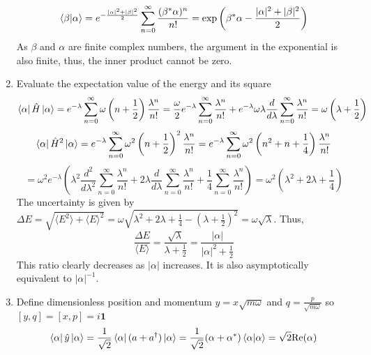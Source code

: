 \begin{sol}
\begin{enumerate}[label=\textbf{(\alph*)}]
\begin{equation}
	\braket{\beta}{\alpha}=e^{-\frac{|\alpha|^2+|\beta|^2}{2}}\sum_{n=0}^\infty\frac{(\beta^*\alpha)^n}{n!}=\exp\left(\beta^*\alpha-\frac{|\alpha|^2+|\beta|^2}{2}\right)
\end{equation} As $\beta$ and $\alpha$ are finite complex numbers, the argument in the exponential is also finite, thus, the inner product cannot be zero.
\item
Evaluate the expectation value of the energy and its square
\begin{equation}
	\bra\alpha\hat H\ket\alpha=e^{-\lambda}\sum_{n=0}^\infty\omega\left(n+\frac{1}{2}\right)\frac{\lambda^n}{n!}=\frac{\omega}{2}e^{-\lambda}\sum_{n=0}^\infty\frac{\lambda^n}{n!}+e^{-\lambda}\omega\lambda\frac{d}{d\lambda}\sum_{n=0}^\infty\frac{\lambda^n}{n!}=\omega\left(\lambda+\frac{1}{2}\right)
\end{equation}
\begin{equation}
	\bra\alpha\hat H^2\ket\alpha=e^{-\lambda}\sum_{n=0}^\infty\omega^2\left(n+\frac{1}{2}\right)^2\frac{\lambda^n}{n!}=e^{-\lambda}\sum_{n=0}^\infty\omega^2\left(n^2+n+\frac{1}{4}\right)\frac{\lambda^n}{n!}
\end{equation} 
\begin{equation}
	=\omega^2e^{-\lambda}\left(\lambda^2\frac{d^2}{d\lambda^2}\sum_{n=0}^\infty\frac{\lambda^n}{n!}+2\lambda\frac{d}{d\lambda}\sum_{n=0}^\infty\frac{\lambda^n}{n!}+\frac{1}{4}\sum_{n=0}^\infty\frac{\lambda^n}{n!}\right)=\omega^2\left(\lambda^2+2\lambda+\frac{1}{4}\right)
\end{equation}
The uncertainty is given by $\Delta E = \sqrt{\langle E^2\rangle+\langle E\rangle^2}=\omega\sqrt{\lambda^2+2\lambda+\frac{1}{4}-\left(\lambda+\frac{1}{2}\right)^2}=\omega\sqrt\lambda$. Thus,
\begin{equation}
	\frac{\Delta E}{\langle E\rangle}=\frac{\sqrt{\lambda}}{\lambda+\frac{1}{2}}=\frac{|\alpha|}{|\alpha|^2+\frac{1}{2}}
\end{equation} 
This ratio clearly decreases as $|\alpha|$ increases. It is also asymptotically equivalent to $|\alpha|^{-1}$.
\item
Define dimensionless position and momentum $y=x\sqrt{m\omega}$ and $q=\frac{p}{\sqrt{m\omega}}$ so $[y,q]=[x,p]=i\mathbf{1}$ 
\begin{equation}
	\bra\alpha\hat y\ket\alpha=\frac{1}{\sqrt{2}}\bra\alpha(a+a^\dagger)\ket\alpha=\frac{1}{\sqrt{2}}(\alpha+\alpha^*)\braket{\alpha}{\alpha}=\sqrt{2}\text{Re}(\alpha)
\end{equation} 
\begin{equation}

\end{equation}
\end{enumerate}
\end{sol}
